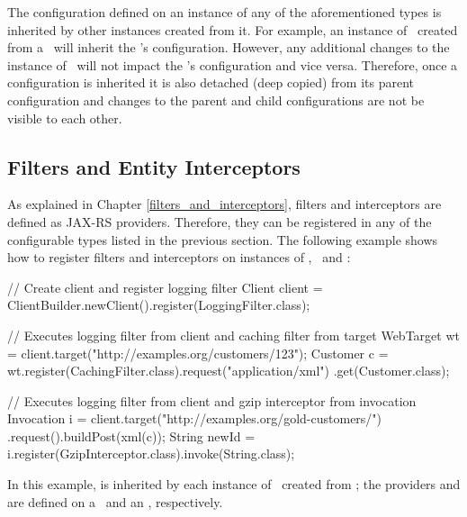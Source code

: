 The configuration defined on an instance of any of the aforementioned types is inherited by other instances created from it. For example, an instance of \WebTarget\ created from a \Client\ will inherit the \Client's configuration. However, any additional changes to the instance of \WebTarget\ will not impact the \Client's configuration and vice versa. Therefore, once a configuration is inherited it is also detached (deep copied) from its parent configuration and changes to the parent and child configurations are not be visible to each other.

\subsection{Filters and Entity Interceptors}
\label{filters_interceptors_client}

As explained in Chapter \ref{filters_and_interceptors}, filters and interceptors are defined as JAX-RS providers. Therefore, they can be registered in any of the configurable types listed in the previous section. The following example shows how to register filters and interceptors on instances of \Client, \WebTarget\ and \Invocation:

\begin{listing}{1}
// Create client and register logging filter
Client client = ClientBuilder.newClient().register(LoggingFilter.class);

// Executes logging filter from client and caching filter from target
WebTarget wt = client.target("http://examples.org/customers/123");
Customer c = wt.register(CachingFilter.class).request("application/xml")
    .get(Customer.class);

// Executes logging filter from client and gzip interceptor from invocation
Invocation i = client.target("http://examples.org/gold-customers/")
    .request().buildPost(xml(c));
String newId = i.register(GzipInterceptor.class).invoke(String.class);
\end{listing}

In this example,  is inherited by each instance of \WebTarget\ created from ; the providers  and  are defined on a \WebTarget\ and an \Invocation, respectively.






